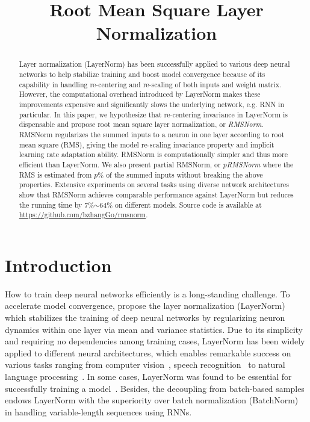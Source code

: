 \title{Root Mean Square Layer Normalization}

\begin{abstract}
Layer normalization (LayerNorm) has been successfully applied to various deep neural networks to help stabilize training and boost model convergence because of its capability in handling re-centering and re-scaling of both inputs and weight matrix. However, the computational overhead introduced by LayerNorm makes these improvements expensive and significantly slows the underlying network, e.g. RNN in particular. In this paper, we hypothesize that re-centering invariance in LayerNorm is dispensable and propose root mean square layer normalization, or \textit{RMSNorm}. RMSNorm regularizes the summed inputs to a neuron in one layer according to root mean square (RMS), giving the model re-scaling invariance property and implicit learning rate adaptation ability. RMSNorm is computationally simpler and thus more efficient than LayerNorm. We also present partial RMSNorm, or \textit{$p$RMSNorm} where the RMS is estimated from $p$\% of the summed inputs without breaking the above properties. Extensive experiments on several tasks using diverse network architectures show that RMSNorm achieves comparable performance against LayerNorm but reduces the running time by 7\%$\sim$64\% on different models. Source code is available at \url{https://github.com/bzhangGo/rmsnorm}.
\end{abstract}

\section{Introduction}

How to train deep neural networks efficiently is a long-standing challenge. To accelerate model convergence, \citet{ba2016layer} propose the layer normalization (LayerNorm) which stabilizes the training of deep neural networks by regularizing neuron dynamics within one layer via mean and variance statistics. Due to its simplicity and requiring no dependencies among training cases, LayerNorm has been widely applied to different neural architectures, which enables remarkable success on various tasks ranging from computer vision~\cite{parmar2018image,sharma2018conceptual}, speech recognition~\cite{zhou2018syllable} to natural language processing~\cite{NIPS2017_7181,zhang2019lightweight}. In some cases, LayerNorm was found to be essential for successfully training a model~\cite{P18-1008}. Besides, the decoupling from batch-based samples endows LayerNorm with the superiority over batch normalization (BatchNorm)~\cite{Ioffe:2015:BNA:3045118.3045167} in handling variable-length sequences using RNNs.

